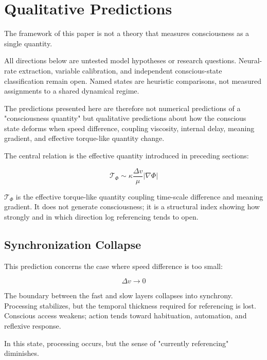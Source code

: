 \section{Qualitative Predictions}


The framework of this paper is not a theory that measures consciousness as a single quantity.

All directions below are untested model hypotheses or research questions. Neural-rate extraction, variable calibration, and independent conscious-state classification remain open. Named states are heuristic comparisons, not measured assignments to a shared dynamical regime.

The predictions presented here are therefore not numerical predictions of a "consciousness quantity" but qualitative predictions about how the conscious state deforms when speed difference, coupling viscosity, internal delay, meaning gradient, and effective torque-like quantity change.

The central relation is the effective quantity introduced in preceding sections:

\begin{equation}
\mathcal{T}_{\Phi} \sim \kappa \frac{\Delta v}{\mu} \left|\nabla \Phi\right|
\end{equation}

$\mathcal{T}_{\Phi}$ is the effective torque-like quantity coupling time-scale difference and meaning gradient. It does not generate consciousness; it is a structural index showing how strongly and in which direction log referencing tends to open.

\subsection{Synchronization Collapse}


This prediction concerns the case where speed difference is too small:

\begin{equation}
\Delta v \rightarrow 0
\end{equation}

The boundary between the fast and slow layers collapses into synchrony. Processing stabilizes, but the temporal thickness required for referencing is lost. Conscious access weakens; action tends toward habituation, automation, and reflexive response.

In this state, processing occurs, but the sense of "currently referencing" diminishes.

